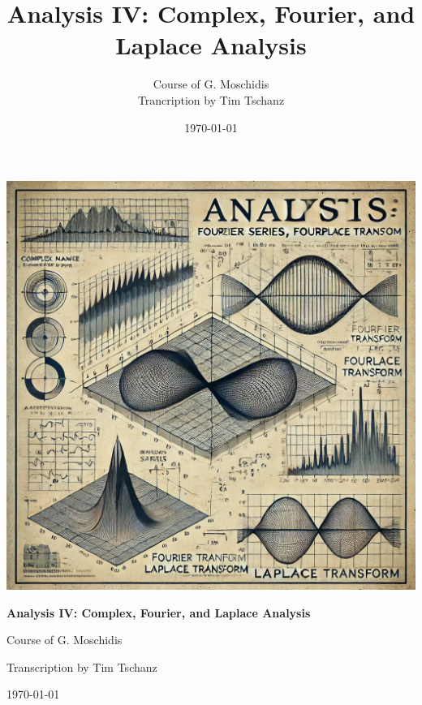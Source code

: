 \documentclass[a4paper,11pt]{book}
\title{Analysis IV: Complex, Fourier, and Laplace Analysis}
\author{Course of G. Moschidis\\Trancription by Tim Tschanz}
\date{\today}
\begin{document}
\begin{titlepage}
    \centering
    \includegraphics[width=\textwidth]{Cover_Image.png}
    {\huge\bfseries Analysis IV: Complex, Fourier, and Laplace Analysis\par}
    {
        \vspace{1cm}
        {\large Course of G. Moschidis\par}
        {\large Transcription by Tim Tschanz\par}
        \vspace{1cm}
    }
    {\large \today\par}
\end{titlepage}

\tableofcontents







\end{document}
